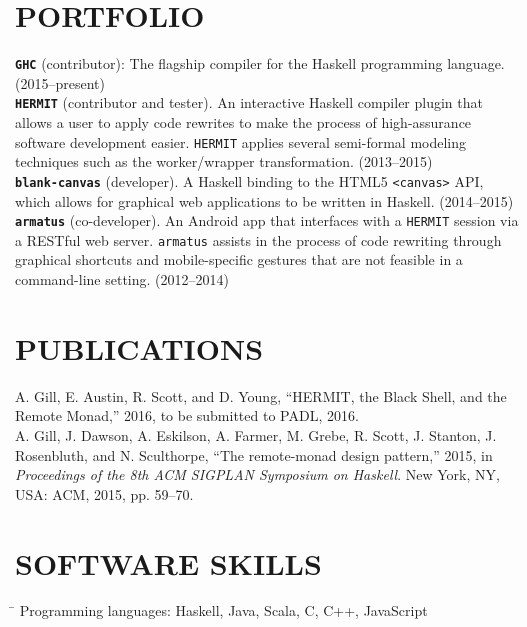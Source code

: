 \documentclass{res}
\begin{document}
\begin{resume}
\section{PORTFOLIO}
	\texttt{\textbf{GHC}} (contributor): The flagship compiler for the Haskell programming language. (2015--present) \vspace{0.04in} \\
    \texttt{\textbf{HERMIT}} (contributor and tester). An interactive Haskell compiler plugin that allows a user to apply code rewrites to make the process of high-assurance software development easier. \verb+HERMIT+ applies several semi-formal modeling techniques such as the worker/wrapper transformation. (2013--2015) \vspace{0.04in} \\
    \texttt{\textbf{blank-canvas}} (developer). A Haskell binding to the HTML5 \texttt{<canvas>} API, which allows for graphical web applications to be written in Haskell. (2014--2015) \vspace{0.04in} \\
    \texttt{\textbf{armatus}} (co-developer). An Android app that interfaces with a \verb+HERMIT+ session via a RESTful web server. \verb+armatus+ assists in the process of code rewriting through graphical shortcuts and mobile-specific gestures that are not feasible in a command-line setting. (2012--2014) \vspace{0.04in}

\section{PUBLICATIONS}
    A. Gill, E. Austin, R. Scott, and D. Young, ``HERMIT, the Black Shell, and the Remote Monad,'' 2016, to be submitted to PADL, 2016.
    \vspace{0.04in} \\
	A. Gill, J. Dawson, A. Eskilson, A. Farmer, M. Grebe, R. Scott, J. Stanton, J. Rosenbluth, and N. Sculthorpe, ``The remote-monad design pattern,'' 2015, in \textit{Proceedings of the 8th ACM SIGPLAN Symposium on Haskell}. New York, NY, USA: ACM, 2015, pp. 59–70.

\section{SOFTWARE SKILLS}
   \vspace{-0.1in}
   \begin{tabbing}
   \hspace{1.8in} \= \kill %
    Programming languages:         \> Haskell, Java, Scala, C, C++, JavaScript \\
   \end{tabbing}

\end{resume}
\end{document}
